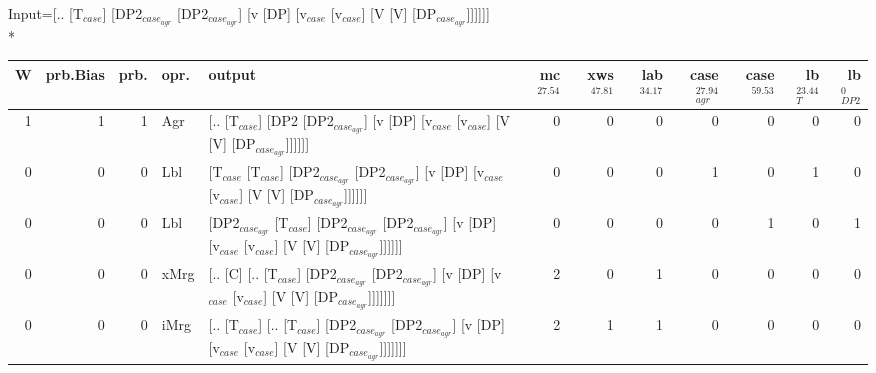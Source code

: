 \begingroup\scriptsize Input=[.. [T$_{case}$] [DP2$_{case_{agr}}$ [DP2$_{case_{agr}}$] [v [DP] [v$_{case}$ [v$_{case}$] [V [V] [DP$_{case_{agr}}$]]]]]]\\*
\begin{tabularx}{\linewidth}{rrrlXrrrrrrr}
\hline
   W &   prb.Bias &   prb. & opr.   & output                                                                                                                                                                           &   mc$^{27.54}$ &   xws$^{47.81}$ &   lab$^{34.17}$ &   case$_{agr}^{27.94}$ &   case$^{59.53}$ &   lb$_{T}^{23.44}$ &   lb$_{DP2}^{0}$ \\
\hline
   1 &       1 &   1 & Agr  & [.. [T$_{case}$] [DP2 [DP2$_{case_{agr}}$] [v [DP] [v$_{case}$ [v$_{case}$] [V [V] [DP$_{case_{agr}}$]]]]]]                                                                                              &            0 &             0 &             0 &                  0 &              0 &              0 &            0 \\
   0 &       0 &   0 & Lbl  & [T$_{case}$ [T$_{case}$] [DP2$_{case_{agr}}$ [DP2$_{case_{agr}}$] [v [DP] [v$_{case}$ [v$_{case}$] [V [V] [DP$_{case_{agr}}$]]]]]]                                                                                 &            0 &             0 &             0 &                  1 &              0 &              1 &            0 \\
   0 &       0 &   0 & Lbl  & [DP2$_{case_{agr}}$ [T$_{case}$] [DP2$_{case_{agr}}$ [DP2$_{case_{agr}}$] [v [DP] [v$_{case}$ [v$_{case}$] [V [V] [DP$_{case_{agr}}$]]]]]]                                                                           &            0 &             0 &             0 &                  0 &              1 &              0 &            1 \\
   0 &       0 &   0 & xMrg & [.. [C] [.. [T$_{case}$] [DP2$_{case_{agr}}$ [DP2$_{case_{agr}}$] [v [DP] [v$_{case}$ [v$_{case}$] [V [V] [DP$_{case_{agr}}$]]]]]]]                                                                            &            2 &             0 &             1 &                  0 &              0 &              0 &            0 \\
   0 &       0 &   0 & iMrg & [.. [T$_{case}$] [.. [T$_{case}$] [DP2$_{case_{agr}}$ [DP2$_{case_{agr}}$] [v [DP] [v$_{case}$ [v$_{case}$] [V [V] [DP$_{case_{agr}}$]]]]]]]                                                                       &            2 &             1 &             1 &                  0 &              0 &              0 &            0 \\

\end{tabularx}
